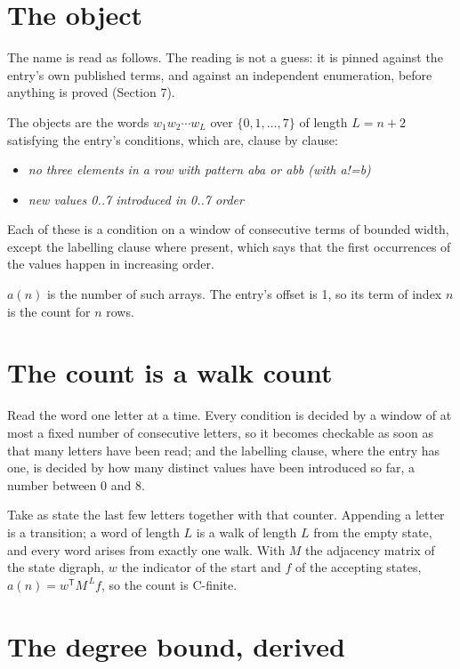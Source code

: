 \documentclass[11pt]{article}
\theoremstyle{definition}
\begin{document}
\section{The object}

The name is read as follows. The reading is not a guess: it is pinned against the entry's own published terms, and against an independent enumeration, before anything is proved (Section 7).

The objects are the words $w_1 w_2 \cdots w_L$ over $\{0,1,\dots,7\}$ of length $L = n + 2$ satisfying the entry's conditions, which are, clause by clause:

\begin{itemize}

\item {\itshape no three elements in a row with pattern aba or abb (with a!=b)}

\item {\itshape new values 0..7 introduced in 0..7 order}

\end{itemize}

Each of these is a condition on a window of consecutive terms of bounded width, except the labelling clause where present, which says that the first occurrences of the values happen in increasing order.

$a(n)$ is the number of such arrays. The entry's offset is 1, so its term of index $n$ is the count for $n$ rows.

\section{The count is a walk count}

Read the word one letter at a time. Every condition is decided by a window of at most a fixed number of consecutive letters, so it becomes checkable as soon as that many letters have been read; and the labelling clause, where the entry has one, is decided by how many distinct values have been introduced so far, a number between $0$ and 8.

Take as state the last few letters together with that counter. Appending a letter is a transition; a word of length $L$ is a walk of length $L$ from the empty state, and every word arises from exactly one walk. With $M$ the adjacency matrix of the state digraph, $w$ the indicator of the start and $f$ of the accepting states, $a(n) = w^{\mathsf T}M^{\,L}f$, so the count is C-finite.

\section{The degree bound, derived}
\end{document}
